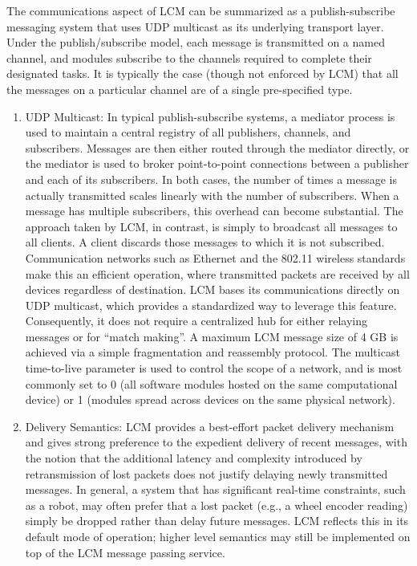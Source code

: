 \begin{itemize}
	The communications aspect of LCM can be summarized as a publish-subscribe messaging system that uses UDP multicast as its underlying transport layer. Under the publish/subscribe model, each message is transmitted on a named channel, and modules subscribe to the channels required to complete their designated tasks. It is typically the case (though not enforced by LCM) that all the messages on a particular channel are of a single pre-specified type.
		\begin{enumerate}
		\item 
		UDP Multicast: In typical publish-subscribe systems, a mediator process is used to maintain a central registry of all publishers, channels, and subscribers. Messages are then either routed through the mediator directly, or the mediator is used to broker point-to-point connections between a publisher and each of its subscribers. In both cases, the number of times a message is actually transmitted scales linearly with the number of subscribers. When a message has multiple subscribers, this overhead can become substantial. The approach taken by LCM, in contrast, is simply to broadcast all messages to all clients. A client discards those messages to which it is not subscribed. Communication networks such as Ethernet and the 802.11 wireless standards make this an efficient operation, where transmitted packets are received by all devices regardless of destination.
		LCM bases its communications directly on UDP multicast, which provides a standardized way to leverage this feature. Consequently, it does not require a centralized hub for either relaying messages or for “match making”. A maximum LCM message size of 4 GB is achieved via a simple fragmentation and reassembly protocol. The multicast time-to-live parameter is used to control the scope of a network, and is most commonly set to 0 (all software modules hosted on the same computational device) or 1 (modules spread across devices on the same physical network). 
		\item
		Delivery Semantics: LCM provides a best-effort packet delivery mechanism and gives strong preference to the expedient delivery of recent messages, with the notion that the additional latency and complexity introduced by retransmission of lost packets does not justify delaying newly transmitted messages.
		In general, a system that has significant real-time constraints, such as a robot, may often prefer that a lost packet (e.g., a wheel encoder reading) simply be dropped rather than delay future messages. LCM reflects this in its default mode of operation; higher level semantics may still be implemented on top of the LCM message passing service.
		\end{enumerate}
	\end{itemize}


